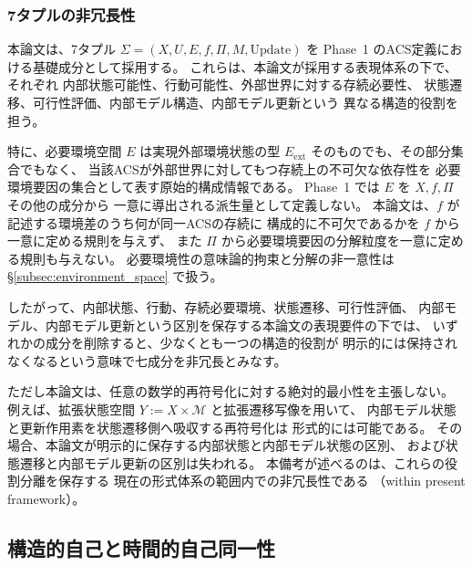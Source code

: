 \subsubsection{7タプルの非冗長性}

\begin{remark}[7タプルの非冗長性]
\label{rem:tuple_nonredundancy}
本論文は、7タプル
$\Sigma=(X,U,E,f,\Pi,M,\mathrm{Update})$ を
Phase~1 のACS定義における基礎成分として採用する。
これらは、本論文が採用する表現体系の下で、それぞれ
内部状態可能性、行動可能性、外部世界に対する存続必要性、
状態遷移、可行性評価、内部モデル構造、内部モデル更新という
異なる構造的役割を担う。

特に、必要環境空間 $E$ は実現外部環境状態の型
$E_{\mathrm{ext}}$ そのものでも、その部分集合でもなく、
当該ACSが外部世界に対してもつ存続上の不可欠な依存性を
必要環境要因の集合として表す原始的構成情報である。
Phase~1 では $E$ を $X,f,\Pi$ その他の成分から
一意に導出される派生量として定義しない。
本論文は、$f$ が記述する環境差のうち何が同一ACSの存続に
構成的に不可欠であるかを $f$ から一意に定める規則を与えず、
また $\Pi$ から必要環境要因の分解粒度を一意に定める規則も与えない。
必要環境性の意味論的拘束と分解の非一意性は
\S\ref{subsec:environment_space} で扱う。

したがって、内部状態、行動、存続必要環境、状態遷移、可行性評価、
内部モデル、内部モデル更新という区別を保存する本論文の表現要件の下では、
いずれかの成分を削除すると、少なくとも一つの構造的役割が
明示的には保持されなくなるという意味で七成分を非冗長とみなす。

ただし本論文は、任意の数学的再符号化に対する絶対的最小性を主張しない。
例えば、拡張状態空間 $Y:=X\times\mathcal{M}$ と拡張遷移写像を用いて、
内部モデル状態と更新作用素を状態遷移側へ吸収する再符号化は
形式的には可能である。
その場合、本論文が明示的に保存する内部状態と内部モデル状態の区別、
および状態遷移と内部モデル更新の区別は失われる。
本備考が述べるのは、これらの役割分離を保存する
現在の形式体系の範囲内での非冗長性である
（within present framework）。
\end{remark}

\subsection{構造的自己と時間的自己同一性}
\label{subsec:self_formal_definition}

